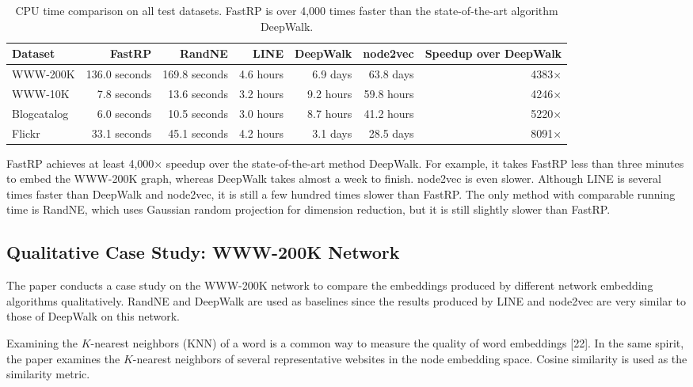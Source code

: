 \documentclass[11pt]{article}
\begin{document}
\begin{table}[H]
\centering
\caption{CPU time comparison on all test datasets. FastRP is over 4,000 times faster than the state-of-the-art algorithm DeepWalk.}
\label{tab:runtime}
\begin{tabular}{@{}lrrrrrr@{}}
\toprule
Dataset & FastRP & RandNE & LINE & DeepWalk & node2vec & Speedup over DeepWalk \\
\midrule
WWW-200K & 136.0 seconds & 169.8 seconds & 4.6 hours & 6.9 days & 63.8 days & 4383$\times$ \\
WWW-10K & 7.8 seconds & 13.6 seconds & 3.2 hours & 9.2 hours & 59.8 hours & 4246$\times$ \\
Blogcatalog & 6.0 seconds & 10.5 seconds & 3.0 hours & 8.7 hours & 41.2 hours & 5220$\times$ \\
Flickr & 33.1 seconds & 45.1 seconds & 4.2 hours & 3.1 days & 28.5 days & 8091$\times$ \\
\bottomrule
\end{tabular}
\end{table}

FastRP achieves at least 4,000$\times$ speedup over the state-of-the-art method DeepWalk. For example, it takes FastRP less than three minutes to embed the WWW-200K graph, whereas DeepWalk takes almost a week to finish. node2vec is even slower. Although LINE is several times faster than DeepWalk and node2vec, it is still a few hundred times slower than FastRP. The only method with comparable running time is RandNE, which uses Gaussian random projection for dimension reduction, but it is still slightly slower than FastRP.

\subsection{Qualitative Case Study: WWW-200K Network}

The paper conducts a case study on the WWW-200K network to compare the embeddings produced by different network embedding algorithms qualitatively. RandNE and DeepWalk are used as baselines since the results produced by LINE and node2vec are very similar to those of DeepWalk on this network.

Examining the $K$-nearest neighbors (KNN) of a word is a common way to measure the quality of word embeddings [22]. In the same spirit, the paper examines the $K$-nearest neighbors of several representative websites in the node embedding space. Cosine similarity is used as the similarity metric.
\end{document}
